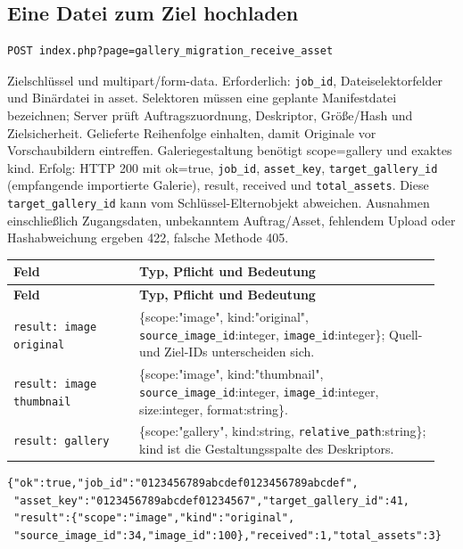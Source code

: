 \documentclass[11pt,a4paper]{article}
\newcommand{\codeword}[1]{\nolinkurl{#1}}
\begin{document}
\subsection{\texorpdfstring{Eine Datei zum Ziel hochladen}{Eine Datei zum Ziel hochladen}}

\label{api352:migration-receive-asset}

\begin{lstlisting}[language={}]
POST index.php?page=gallery_migration_receive_asset
\end{lstlisting}

Zielschlüssel und multipart/form-data. Erforderlich: \codeword{job_id}, Dateiselektorfelder
und Binärdatei in asset. Selektoren müssen eine geplante Manifestdatei bezeichnen; Server
prüft Auftragszuordnung, Deskriptor, Größe/Hash und Zielsicherheit. Gelieferte Reihenfolge
einhalten, damit Originale vor Vorschaubildern eintreffen. Galeriegestaltung benötigt
scope=gallery und exaktes kind. Erfolg: HTTP 200 mit ok=true, \codeword{job_id},
\codeword{asset_key}, \codeword{target_gallery_id} (empfangende importierte Galerie),
result, received und \codeword{total_assets}. Diese \codeword{target_gallery_id} kann vom
Schlüssel-Elternobjekt abweichen. Ausnahmen einschließlich Zugangsdaten, unbekanntem
Auftrag/Asset, fehlendem Upload oder Hashabweichung ergeben 422, falsche Methode 405.

\begin{longtable}{@{}>{\RaggedRight\arraybackslash}p{0.28\linewidth}>{\RaggedRight\arraybackslash}p{0.67\linewidth}@{}}
\toprule
\textbf{Feld} & \textbf{Typ, Pflicht und Bedeutung} \\
\midrule
\endfirsthead
\toprule
\textbf{Feld} & \textbf{Typ, Pflicht und Bedeutung} \\
\midrule
\endhead
\bottomrule
\endfoot
\codeword{result: image original} & \{scope:"image", kind:"original",
\codeword{source_image_id}:integer, \codeword{image_id}:integer\}; Quell- und Ziel-IDs
unterscheiden sich. \\
\codeword{result: image thumbnail} & \{scope:"image", kind:"thumbnail",
\codeword{source_image_id}:integer, \codeword{image_id}:integer, size:integer,
format:string\}. \\
\codeword{result: gallery} & \{scope:"gallery", kind:string,
\codeword{relative_path}:string\}; kind ist die Gestaltungsspalte des Deskriptors. \\
\end{longtable}

\begin{lstlisting}[language={}]
{"ok":true,"job_id":"0123456789abcdef0123456789abcdef",
 "asset_key":"0123456789abcdef01234567","target_gallery_id":41,
 "result":{"scope":"image","kind":"original",
 "source_image_id":34,"image_id":100},"received":1,"total_assets":3}
\end{lstlisting}
\end{document}
